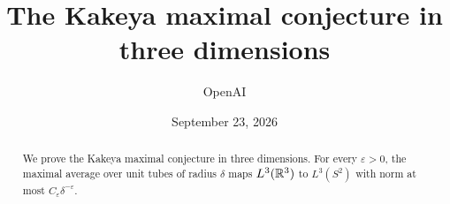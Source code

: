 \documentclass[11pt]{article}
\title{The Kakeya maximal conjecture in three dimensions}
\author{OpenAI}
\date{September 23, 2026}
\begin{document}
\maketitle
\begin{abstract}
We prove the Kakeya maximal conjecture in three dimensions. For every
\(\varepsilon>0\), the maximal average over unit tubes of radius \(\delta\)
maps \(L^3(\mathbb R^3)\) to \(L^3(S^2)\) with norm at most
\(C_\varepsilon\delta^{-\varepsilon}\).
\end{abstract}
\tableofcontents













\end{document}
